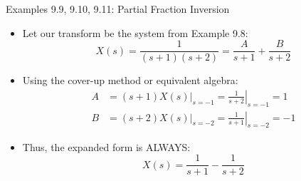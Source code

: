 \begin{frame}{Examples 9.9, 9.10, 9.11: Partial Fraction Inversion}
    \begin{itemize}
        \item Let our transform be the system from Example 9.8:
              \begin{equation*}
                  X(s) = \frac{1}{(s+1)(s+2)} = \frac{A}{s+1} + \frac{B}{s+2}
              \end{equation*}
        \item Using the cover-up method or equivalent algebra:
              \begin{align*}
                  A & = \left. (s+1)X(s) \right|_{s=-1} = \left. \frac{1}{s+2} \right|_{s=-1} = 1  \\
                  B & = \left. (s+2)X(s) \right|_{s=-2} = \left. \frac{1}{s+1} \right|_{s=-2} = -1
              \end{align*}
        \item Thus, the expanded form is ALWAYS:
              \begin{equation*}
                  X(s) = \frac{1}{s+1} - \frac{1}{s+2}
              \end{equation*}
    \end{itemize}
\end{frame}

